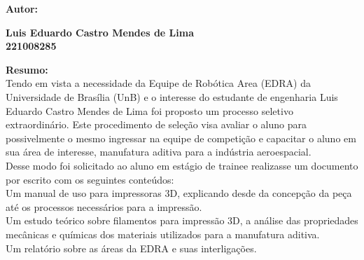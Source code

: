 \textbf{\Large Autor:}\\[0.6 cm]
\begin{center}
    \textbf{\medium Luis Eduardo Castro Mendes de Lima}\\[0.3cm]
    \textbf{\Large 221008285}\\[1.0cm]
\end{center}
\textbf{\Large Resumo:}\\[0.6cm]

    Tendo em vista a necessidade da Equipe de Robótica Area (EDRA) da Universidade de Brasília (UnB) e o interesse do estudante de engenharia Luis Eduardo Castro Mendes de Lima foi proposto um processo seletivo extraordinário. Este procedimento de seleção visa avaliar o aluno para possivelmente o mesmo ingressar na equipe de competição e capacitar o aluno em sua área de interesse, manufatura aditiva para a indústria aeroespacial.\\[0.6cm]

    Desse modo foi solicitado ao aluno em estágio de trainee realizasse um documento por escrito com os seguintes conteúdos:\\[0.4cm]

    Um manual de uso para impressoras 3D, explicando desde da concepção da peça até os processos necessários para a impressão.\\[0.4cm]

    Um estudo teórico sobre filamentos para impressão 3D, a análise das propriedades mecânicas e químicas dos materiais utilizados para a manufatura aditiva.\\[0.4cm]

    Um relatório sobre as áreas da EDRA e suas interligações.\\[0.4cm]

